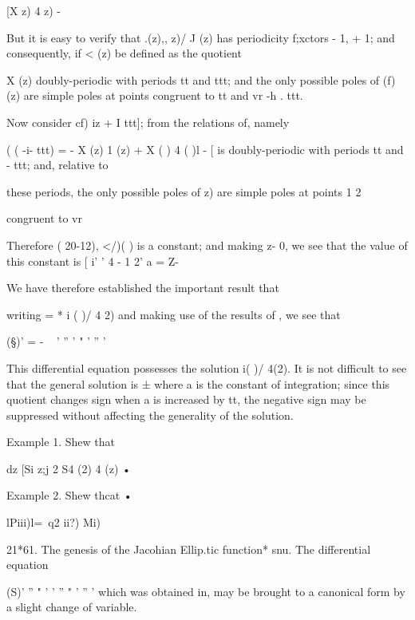 [X z) 4 z) - %

But it is easy to verify that .(z),, z)/ J (z) has periodicity
f;xctors - 1, + 1; and consequently, if < (z) be defined as the
quotient

 X (z) %
doubly-periodic with periods tt and ttt; and the only possible poles
of (f) (z) are simple poles at points congruent to tt and vr -h . ttt.

Now consider cf) iz + I ttt]; from the relations of, namely



( ( -i- ttt) = - X (z) 1 (z) + X ( ) 4 ( )l - [%
is doubly-periodic with periods tt and - ttt; and, relative to

these periods, the only possible poles of z) are simple poles at
points 1 2

congruent to vr

%
%

Therefore ( 20-12), </)( ) is a constant; and making z- 0, we see that
the value of this constant is [ i' ' 4 - 1 2' a = Z-

We have therefore established the important result that

writing = * i ( )/ 4 2) and making use of the results of , we
see that

(§)' = - ~ ' '' ' " ' '' '

This differential equation possesses the solution i( )/ 4(2). It is
not difficult to see that the general solution is ±%
where a is the constant of integration; since this quotient changes
sign when a is increased by tt, the negative sign may be suppressed
without affecting the generality of the solution.

Example 1. Shew that

dz [Si z;j 2 S4 (2) 4 (z) •

Example 2. Shew thcat •

lPiii)l=\ q2 ii?) Mi)

21*61. The genesis of the Jacohian Ellip.tic function* snu. The
differential equation

(S)' '' " ' ' '' " ' '' ' which was obtained in, may be brought
to a canonical form by a slight change of variable.


